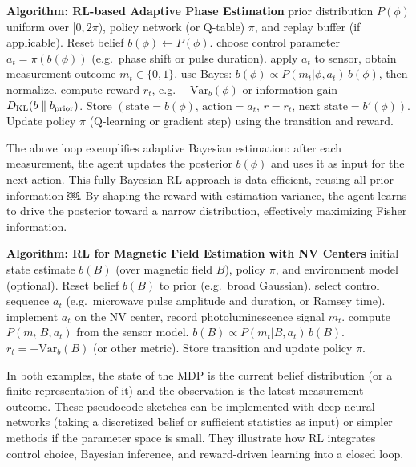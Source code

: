 \documentclass[
    aps,
    prx,
    reprint,
    superscriptaddress,
    amsmath,
    amssymb,
    longbibliography
]{revtex4-2}
\begin{document}
\begin{algorithmic}[1]
\State \textbf{Algorithm: RL-based Adaptive Phase Estimation}
 prior distribution $P(\phi)$ uniform over $[0,2\pi)$, policy network (or Q-table) $\pi$, and replay buffer (if applicable).
  \State Reset belief $b(\phi)\leftarrow P(\phi)$.
     choose control parameter $a_t = \pi(b(\phi))$ (e.g.\ phase shift or pulse duration).
     apply $a_t$ to sensor, obtain measurement outcome $m_t\in\{0,1\}$.
     use Bayes: $b(\phi)\propto P(m_t|\phi,a_t)\,b(\phi)$, then normalize.
     compute reward $r_t$, e.g.\ $-\mathrm{Var}_b(\phi)$ or information gain $D_{\rm KL}(b\parallel b_{\rm prior})$.
    \State Store $(\text{state}=b(\phi),\,\text{action}=a_t,\,r=r_t,\,\text{next state}=b'(\phi))$.
    \State Update policy $\pi$ (Q-learning or gradient step) using the transition and reward.
  \EndFor
\EndFor
\end{algorithmic}

The above loop exemplifies adaptive Bayesian estimation: after each
measurement, the agent updates the posterior $b(\phi)$ and uses it as
input for the next action.  This fully Bayesian RL approach is
data-efficient, reusing all prior information ￼. By shaping the reward
with estimation variance, the agent learns to drive the posterior
toward a narrow distribution, effectively maximizing Fisher
information.

\begin{algorithmic}[1]
\State \textbf{Algorithm: RL for Magnetic Field Estimation with NV Centers}
 initial state estimate $b(B)$ (over magnetic field $B$), policy $\pi$, and environment model (optional).
  \State Reset belief $b(B)$ to prior (e.g.\ broad Gaussian).
     select control sequence $a_t$ (e.g.\ microwave pulse amplitude and duration, or Ramsey time).
     implement $a_t$ on the NV center, record photoluminescence signal $m_t$.
     compute $P(m_t|B,a_t)$ from the sensor model.
     $b(B)\propto P(m_t|B,a_t)\,b(B)$.
     $r_t = -\mathrm{Var}_b(B)$ (or other metric).
    \State Store transition and update policy $\pi$.
  \EndFor
\EndFor
\end{algorithmic}

In both examples, the state of the MDP is the current belief
distribution (or a finite representation of it) and the observation is
the latest measurement outcome.  These pseudocode sketches can be
implemented with deep neural networks (taking a discretized belief or
sufficient statistics as input) or simpler methods if the parameter
space is small.  They illustrate how RL integrates control choice,
Bayesian inference, and reward-driven learning into a closed loop.
\end{document}
